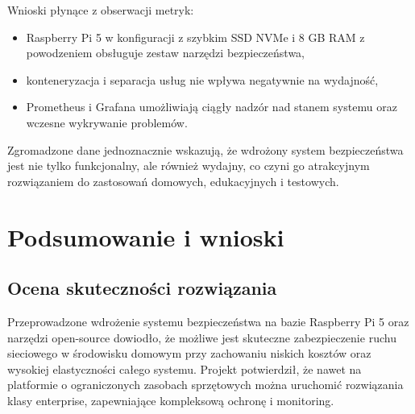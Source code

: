 \documentclass[
    left=2.5cm,         %
    right=2.5cm,        %
    top=2.5cm,          %
    bottom=3cm,         %
    bindingoffset=6mm,  %
    nohyphenation=true %
]{eiti/eiti-thesis} %
\begin{document}
Wnioski płynące z obserwacji metryk:
\begin{itemize}
    \item Raspberry Pi 5 w konfiguracji z szybkim SSD NVMe i 8 GB RAM z powodzeniem obsługuje zestaw narzędzi bezpieczeństwa,
    \item konteneryzacja i separacja usług nie wpływa negatywnie na wydajność,
    \item Prometheus i Grafana umożliwiają ciągły nadzór nad stanem systemu oraz wczesne wykrywanie problemów.
\end{itemize}

Zgromadzone dane jednoznacznie wskazują, że wdrożony system bezpieczeństwa jest nie tylko funkcjonalny, ale również wydajny, co czyni go atrakcyjnym rozwiązaniem do zastosowań domowych, edukacyjnych i testowych.

\newpage 
\section{Podsumowanie i wnioski}

\subsection{Ocena skuteczności rozwiązania}

Przeprowadzone wdrożenie systemu bezpieczeństwa na bazie Raspberry Pi 5 oraz narzędzi open-source dowiodło, że możliwe jest skuteczne zabezpieczenie ruchu sieciowego w środowisku domowym przy zachowaniu niskich kosztów oraz wysokiej elastyczności całego systemu. Projekt potwierdził, że nawet na platformie o ograniczonych zasobach sprzętowych można uruchomić rozwiązania klasy enterprise, zapewniające kompleksową ochronę i monitoring.
\end{document}
